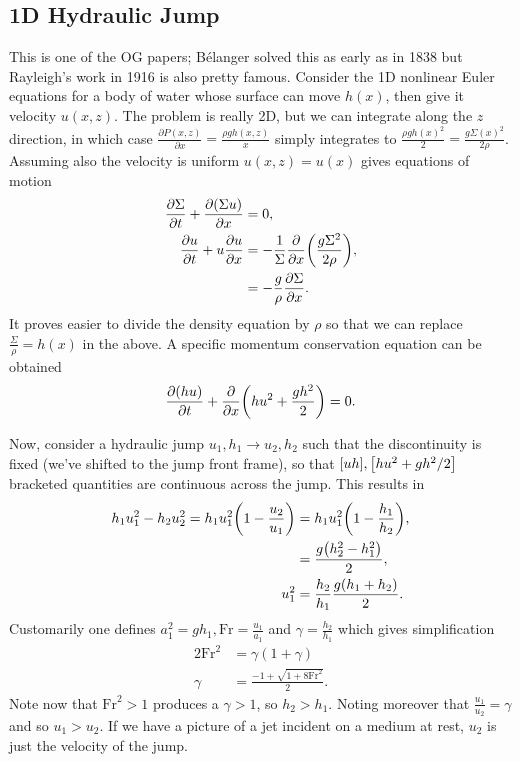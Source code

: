 \documentclass[11pt,
        usenames, %
        dvipsnames %
    ]{report}
\newcommand*{\pd}[2]{\frac{\partial#1}{\partial#2}}
\DeclarePairedDelimiter\p{\lparen}{\rparen}
\DeclarePairedDelimiter\s{\lbrack}{\rbrack}
\begin{document}
\subsection{1D Hydraulic Jump}

This is one of the OG papers; B\'elanger solved this as early as in 1838 but
Rayleigh's work in 1916 is also pretty famous. Consider the 1D nonlinear Euler
equations for a body of water whose surface can move $h(x)$, then give it
velocity $u(x, z)$. The problem is really 2D, but we can integrate along the $z$
direction, in which case $\pd{P(x, z)}{x} = \frac{\rho g h(x, z)}{x}$ simply
integrates to $\frac{\rho g h(x)^2}{2} = \frac{g\Sigma(x)^2}{2\rho}$. Assuming
also the velocity is uniform $u(x, z) = u(x)$ gives equations of motion
\begin{align}
    \pd{\Sigma}{t} + \pd{(\Sigma u)}{x} &= 0,\\
    \pd{u}{t} + u\pd{u}{x} &=
        -\frac{1}{\Sigma}\pd{}{x}\p*{\frac{g\Sigma^2}{2\rho}},\nonumber\\
        &= -\frac{g}{\rho}\pd{\Sigma}{x}.
\end{align}
It proves easier to divide the density equation by $\rho$ so that we can replace
$\frac{\Sigma}{\rho} = h(x)$ in the above. A specific momentum conservation
equation can be obtained
\begin{equation}
    \pd{(hu)}{t} + \pd{}{x}\p*{hu^2 + \frac{gh^2}{2}} = 0.
\end{equation}

Now, consider a hydraulic jump $u_1, h_1 \to u_2, h_2$ such that the
discontinuity is fixed (we've shifted to the jump front frame), so that
$\s*{uh}, \s*{hu^2 + gh^2/2}$ bracketed quantities are continuous across the jump.
This results in
\begin{align}
    h_1u_1^2 - h_2u_2^2 = h_1u_1^2\p*{1 - \frac{u_2}{u_1}}
        &= h_1u_1^2\p*{1 - \frac{h_1}{h_2}},\nonumber\\
        &= \frac{g\p*{h_2^2 - h_1^2}}{2},\nonumber\\
    u_1^2 &= \frac{h_2}{h_1}\frac{g\p*{h_1 + h_2}}{2}.
\end{align}
Customarily one defines $a_1^2 = gh_1, \mathrm{Fr} =
\frac{u_1}{a_1}$ and $\gamma = \frac{h_2}{h_1}$ which gives simplification
\begin{align}
    2\mathrm{Fr}^2 &= \gamma(1 + \gamma)\nonumber\\
    \gamma &= \frac{-1 + \sqrt{1 + 8\mathrm{Fr}^2}}{2}.
\end{align}
Note now that $\mathrm{Fr}^2 > 1$ produces a $\gamma > 1$, so $h_2 > h_1$.
Noting moreover that $\frac{u_1}{u_2} = \gamma$ and so $u_1 > u_2$. If we have a
picture of a jet incident on a medium at rest, $u_2$ is just the velocity of the
jump.
\end{document}
